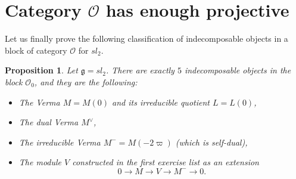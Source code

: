 \documentclass[12pt]{article}
\theoremstyle{plain}
\newtheorem{prop}[thm]{Proposition}
\theoremstyle{definition}
\numberwithin{equation}{section}
\newcommand{\g}{\mathfrak{g}}
\newcommand{\OO}{\mathcal{O}}
\begin{document}
\section{Category $\OO$ has enough projective}


Let us finally prove the following classification of indecomposable objects in a block of category $\OO$ for $sl_2$.
\begin{prop}
Let $\g = sl_2$. There are exactly $5$ indecomposable objects in the block $\OO_0$, and they are the following:
\begin{itemize}
\item The Verma $M = M(0)$ and its irreducible quotient $L = L(0)$,

\item The dual Verma $M^\vee$,

\item The irreducible Verma $M^- = M(-2\varpi)$ (which is self-dual),

\item The module $V$ constructed in the first exercise list as an extension
\[
0 \rightarrow M \rightarrow V \rightarrow M^- \rightarrow 0.
\]
\end{itemize}
\end{prop}
\end{document}
